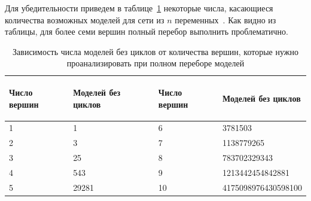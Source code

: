 Для убедительности приведем в таблице~\ref{table:domain:learning:number_of_models} некоторые числа, касающиеся количества возможных моделей для сети из $n$ переменных~\cite{terentyev_2006}.
Как видно из таблицы, для более семи вершин полный перебор выполнить проблематично.

\begin{table}[ht]
\caption{Зависимость числа моделей без циклов от количества вершин, которые нужно проанализировать при полном переборе моделей}
\label{table:domain:learning:number_of_models}
\centering
  \begin{tabular}{| >{\centering}m{} 
                  | >{\raggedleft}m{} 
                  | >{\centering}m{} 
                  | >{\raggedleft\arraybackslash}m{}|}
  \hline Число вершин & \begin{center} Моделей без циклов \end{center} & Число вершин & \begin{center} Моделей без циклов \end{center} \\
  \hline \num{1} & \num{1} & \num{6} & \num{3781503} \\
  \hline \num{2} & \num{3} & \num{7} & \num{1138779265} \\
  \hline \num{3} & \num{25} & \num{8} & \num{783702329343} \\
  \hline \num{4} & \num{543} & \num{9} & \num{1213442454842881} \\
  \hline \num{5} & \num{29281} & \num{10} & \num{4175098976430598100} \\
  \hline
  \end{tabular}
\end{table}


